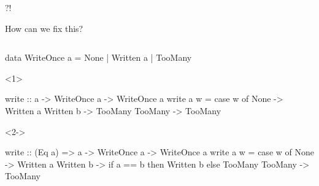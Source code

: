 \documentclass[UKenglish,usenames,dvipsnames,svgnames,table,aspectratio=169,mathserif]{beamer}
\newcommand{\nl}{\vspace{\baselineskip}}
\begin{document}
\begin{frame}
\centering
\fontsize{60}{70}\selectfont $?!$

\end{frame}


\begin{frame}
\centering \huge

How can we fix this?
\end{frame}


\begin{frame}[fragile]
\begin{columns}
\begin{overlayarea}{\textwidth}{0.6\textheight}
\begin{haskellcode}
data WriteOnce a
  = None
  | Written a
  | TooMany
\end{haskellcode}

\nl

\begin{onlyenv}<1>
\begin{haskellcode}
write ::           a -> WriteOnce a -> WriteOnce a
write a w = case w of
  None      -> Written a
  Written b -> TooMany
  TooMany   -> TooMany
\end{haskellcode}
\end{onlyenv}

\begin{onlyenv}<2->
\begin{haskellcode}
write :: (Eq a) => a -> WriteOnce a -> WriteOnce a
write a w = case w of
  None      -> Written a
  Written b -> if a == b then Written b else TooMany
  TooMany   -> TooMany
\end{haskellcode}
\end{onlyenv}
\end{overlayarea}
\end{columns}
\end{frame}
\end{document}
